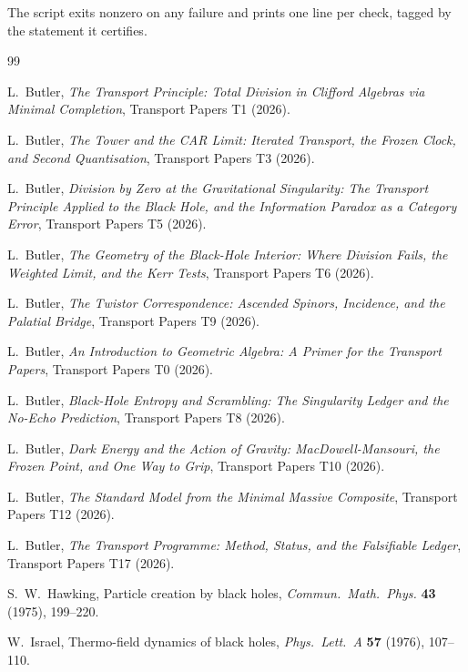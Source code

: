 \begin{description}
\end{description}

The script exits nonzero on any failure and prints one line per check, tagged by the statement it certifies.

\begin{thebibliography}{99}

L.~Butler,
\emph{The Transport Principle: Total Division in Clifford Algebras via Minimal Completion},
Transport Papers T1 (2026).

L.~Butler,
\emph{The Tower and the CAR Limit: Iterated Transport, the Frozen Clock, and Second Quantisation},
Transport Papers T3 (2026).

L.~Butler,
\emph{Division by Zero at the Gravitational Singularity: The Transport Principle Applied to the Black Hole, and the Information Paradox as a Category Error},
Transport Papers T5 (2026).

L.~Butler,
\emph{The Geometry of the Black-Hole Interior: Where Division Fails, the Weighted Limit, and the Kerr Tests},
Transport Papers T6 (2026).

L.~Butler,
\emph{The Twistor Correspondence: Ascended Spinors, Incidence, and the Palatial Bridge},
Transport Papers T9 (2026).

L.~Butler,
\emph{An Introduction to Geometric Algebra: A Primer for the Transport Papers},
Transport Papers T0 (2026).

L.~Butler,
\emph{Black-Hole Entropy and Scrambling: The Singularity Ledger and the No-Echo Prediction},
Transport Papers T8 (2026).

L.~Butler,
\emph{Dark Energy and the Action of Gravity: MacDowell-Mansouri, the Frozen Point, and One Way to Grip},
Transport Papers T10 (2026).

L.~Butler,
\emph{The Standard Model from the Minimal Massive Composite},
Transport Papers T12 (2026).

L.~Butler,
\emph{The Transport Programme: Method, Status, and the Falsifiable Ledger},
Transport Papers T17 (2026).

S.~W.~Hawking,
Particle creation by black holes,
\emph{Commun.\ Math.\ Phys.} \textbf{43} (1975), 199--220.

W.~Israel,
Thermo-field dynamics of black holes,
\emph{Phys.\ Lett.\ A} \textbf{57} (1976), 107--110.


\end{thebibliography}
